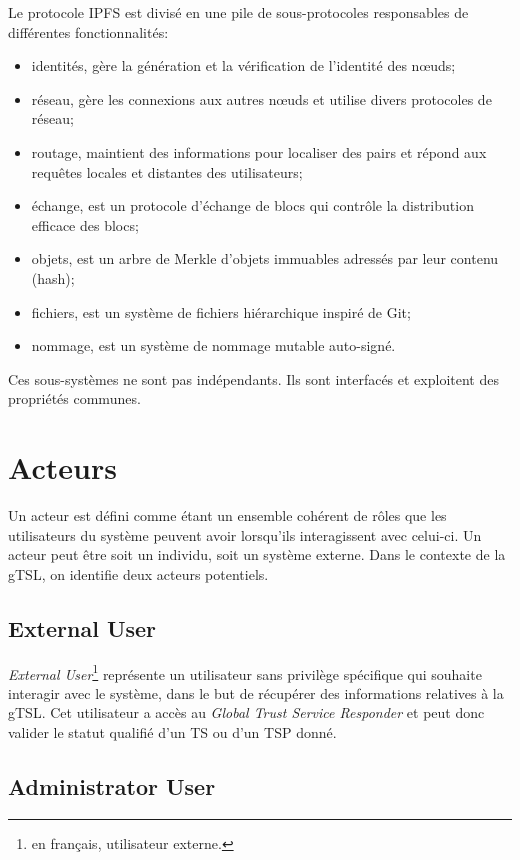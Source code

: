 \documentclass{tnreport}
\begin{document}
Le protocole IPFS est divisé en une pile de sous-protocoles responsables de différentes fonctionnalités:
\begin{itemize}
	\item identités, gère la génération et la vérification de l'identité des nœuds;
	\item réseau, gère les connexions aux autres nœuds et utilise divers protocoles de réseau;
	\item routage, maintient des informations pour localiser des pairs et répond aux requêtes locales et distantes des utilisateurs;
	\item échange, est un protocole d'échange de blocs qui contrôle la distribution efficace des blocs;
	\item objets, est un arbre de Merkle d'objets immuables adressés par leur contenu (hash);
	\item fichiers, est un système de fichiers hiérarchique inspiré de Git;
	\item nommage, est un système de nommage mutable auto-signé.
	\newline
\end{itemize}
Ces sous-systèmes ne sont pas indépendants. Ils sont interfacés et exploitent des propriétés communes.

\section{Acteurs}

Un acteur est défini comme étant un ensemble cohérent de rôles que les utilisateurs du système peuvent avoir lorsqu'ils interagissent avec celui-ci. Un acteur peut être soit un individu, soit un système externe. Dans le contexte de la gTSL, on identifie deux acteurs potentiels.

\subsection{External User}

\textit{External User}\footnote{en français, utilisateur externe.} représente un utilisateur sans privilège spécifique qui souhaite interagir avec le système, dans le but de récupérer des informations relatives à la gTSL. Cet utilisateur a accès au \textit{Global Trust Service Responder} et peut donc valider le statut qualifié d'un TS ou d'un TSP donné.

\subsection{Administrator User}
\end{document}
